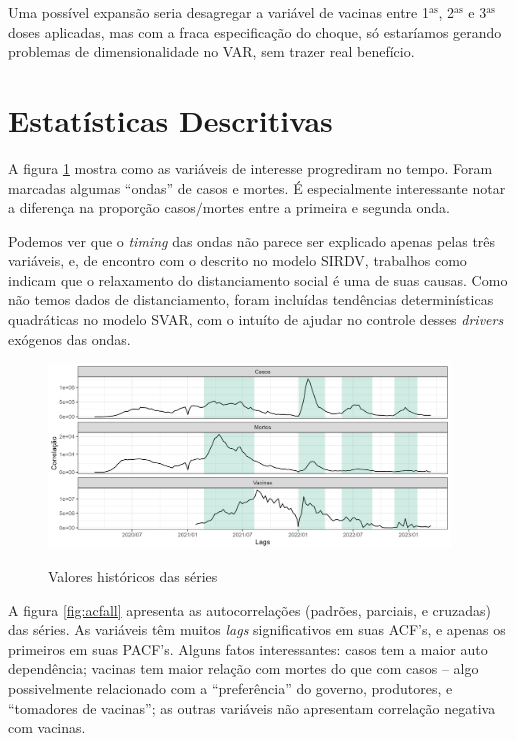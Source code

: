 \documentclass[
    article,
	12pt,				%
	oneside,			%
	a4paper,			%
	english,			%
	brazil,				%
	hyperref = {colorlinks, citecolor=c1d, linkcolor=c2d, urlcolor=c3d, colorlinks}
	]{abntex2}
\newcounter{j}
\begin{document}
Uma possível expansão seria desagregar a variável de vacinas entre 1$^\text{as}$, 2$^\text{as}$ e 3$^\text{as}$ doses aplicadas, mas com a fraca especificação do choque, só estaríamos gerando problemas de dimensionalidade no VAR, sem trazer real benefício.


\section{Estatísticas Descritivas}\label{sec:stat}

A figura \ref{fig:histval} mostra como as variáveis de interesse progrediram no tempo. Foram marcadas algumas ``ondas'' de casos e mortes. É especialmente interessante notar a diferença na proporção casos$/$mortes entre a primeira e segunda onda.

Podemos ver que o \textit{timing} das ondas não parece ser explicado apenas pelas três variáveis, e, de encontro com o descrito no modelo SIRDV, trabalhos como \textcite{Moraes2021} indicam que o relaxamento do distanciamento social é uma de suas causas. Como não temos dados de distanciamento, foram incluídas tendências determinísticas quadráticas no modelo SVAR, com o intuíto de ajudar no controle desses \textit{drivers} exógenos das ondas.

\begin{figure}[H]
    \centering
    \caption{Valores históricos das séries}
    \includegraphics[width = 0.95\textwidth]{Figuras/stat_historic.png}
    \label{fig:histval}
\end{figure}

A figura \ref{fig:acfall} apresenta as autocorrelações (padrões, parciais, e cruzadas) das séries. As variáveis têm muitos \textit{lags} significativos em suas ACF's, e apenas os primeiros em suas PACF's. Alguns fatos interessantes: casos tem a maior auto dependência; vacinas tem maior relação com mortes do que com casos -- algo possivelmente relacionado com a ``preferência'' do governo, produtores, e ``tomadores de vacinas''; as outras variáveis não apresentam correlação negativa com vacinas.
\end{document}
